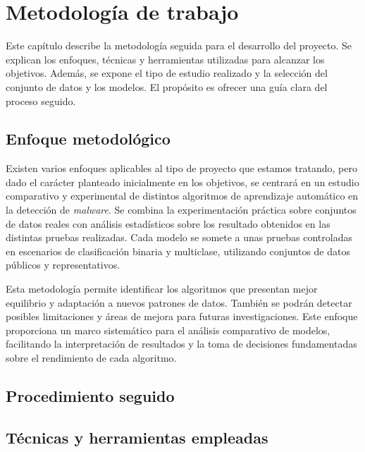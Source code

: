 \chapter{Metodología de trabajo}
\label{ch:metodologia}

Este capítulo describe la metodología seguida para el desarrollo del proyecto. Se explican los enfoques, técnicas y herramientas utilizadas para alcanzar los objetivos. Además, se expone el tipo de estudio realizado y la selección del conjunto de datos y los modelos. El propósito es ofrecer una guía clara del proceso seguido.

\section{Enfoque metodológico}
\label{sec:enfoque}

Existen varios enfoques aplicables al tipo de proyecto que estamos tratando, pero dado el carácter planteado inicialmente en los objetivos, se centrará en un estudio comparativo y experimental de distintos algoritmos de aprendizaje automático en la detección de \textit{malware}. Se combina la experimentación práctica sobre conjuntos de datos reales con análisis estadísticos sobre los resultado obtenidos en las distintas pruebas realizadas. Cada modelo se somete a unas pruebas controladas en escenarios de clasificación binaria y multiclase, utilizando conjuntos de datos públicos y representativos.

\vspace{1em}

Esta metodología permite identificar los algoritmos que presentan mejor equilibrio y adaptación a nuevos patrones de datos. También se podrán detectar posibles limitaciones y áreas de mejora para futuras investigaciones. Este enfoque proporciona un marco sistemático para el análisis comparativo de modelos, facilitando la interpretación de resultados y la toma de decisiones fundamentadas sobre el rendimiento de cada algoritmo.

\section{Procedimiento seguido}
\label{sec:porcedimiento}


\section{Técnicas y herramientas empleadas}
\label{sec:herramientas}

